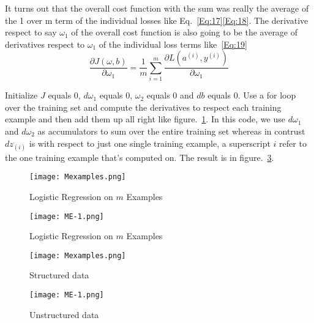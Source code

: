\documentclass[a4paper]{article}
\begin{document}
It turns out that the overall cost function with the sum was really the average of the 1 over m term of the individual losses like Eq.~\ref{Eq:17}\ref{Eq:18}. The derivative respect to say $\omega_1$ of the overall cost function is also going to be the average of derivatives respect to $\omega_1$ of the individual loss terms like~\ref{Eq:19}
\begin{equation}
\frac{\partial J(\omega,b)}{\partial \omega_1}=\frac{1}{m} \sum_{i=1}^m \frac{\partial L(a^{(i)},y^{(i)})}{\partial \omega_1}
\label{Eq:19}
\end{equation}\par
Initialize $J$ equals 0, $d \omega_1$ equals 0, $\omega_2$ equals 0 and $d b$ equals 0. Use a for loop over the training set and compute the derivatives to respect each training example and then add them up all right like figure.~\ref{fig:ME}. In this code, we use $d \omega_1$ and $d \omega_2$ as accumulators to sum over the entire training set whereas in contrust $d z_{(i)}$ is with respect to just one single training example, a superscript $i$ refer to the one training example that's computed on. The result is in figure.~\ref{fig:ME-1}. 

\begin{figure}[!htp]
\begin{center}
   \texttt{[image: Mexamples.png]}
\end{center}
   \caption{Logistic Regression on $m$ Examples}
\label{fig:ME}
\end{figure}

\begin{figure}[!htp]
\begin{center}
   \texttt{[image: ME-1.png]}
\end{center}
   \caption{Logistic Regression on $m$ Examples}
\label{fig:ME-1}
\end{figure}

\begin{figure}
\begin{minipage}[t]{0.5\linewidth}
\centering
\texttt{[image: Mexamples.png]}
\caption{Structured data~\cite{Coursera.org}}
\label{fig:Mexamples}
\end{minipage}%
\begin{minipage}[t]{0.5\linewidth}
\centering
\texttt{[image: ME-1.png]}
\caption{Unstructured data~\cite{Coursera.org}}
\label{fig:ME-1}
\end{minipage}
\end{figure}
\end{document}
